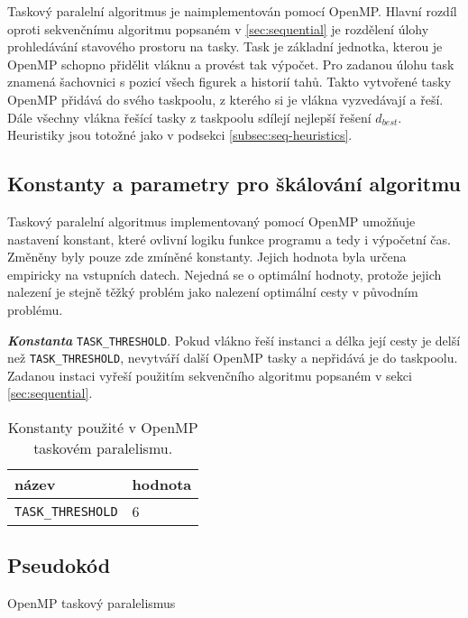 \documentclass{article}
\newcommand{\const}[1]{\texttt{#1}}
\newcommand{\konstanta}[1]{\textbf{\textit{Konstanta}} \const{#1}.}
\begin{document}
    Taskový paralelní algoritmus je naimplementován pomocí OpenMP. Hlavní rozdíl oproti sekvenčnímu algoritmu
    popsaném v \ref{sec:sequential} je rozdělení úlohy prohledávání stavového prostoru na tasky. Task je
    základní jednotka, kterou je OpenMP schopno přidělit vláknu a provést tak výpočet. Pro zadanou úlohu
    task znamená šachovnici s pozicí všech figurek a historií tahů. Takto vytvořené tasky OpenMP přidává
    do svého taskpoolu, z kterého si je vlákna vyzvedávají a řeší. Dále všechny vlákna řešící tasky z
    taskpoolu sdílejí nejlepší řešení $d_{best}$. Heuristiky jsou totožné jako v podsekci \ref{subsec:seq-heuristics}.

    \subsection{Konstanty a parametry pro škálování algoritmu}
    Taskový paralelní algoritmus implementovaný pomocí OpenMP umožňuje nastavení konstant, které ovlivní
    logiku funkce programu a tedy i výpočetní čas. Změněny byly pouze zde zmíněné konstanty. Jejich hodnota
    byla určena empiricky na vstupních datech. Nejedná se o optimální hodnoty, protože jejich nalezení je
    stejně těžký problém jako nalezení optimální cesty v původním problému.

    \konstanta{TASK_THRESHOLD}  Pokud vlákno řeší instanci a délka její cesty je delší než \const{TASK_THRESHOLD}, nevytváří další
    OpenMP tasky a nepřidává je do taskpoolu. Zadanou instaci vyřeší použitím sekvenčního algoritmu popsaném v sekci \ref{sec:sequential}.

    \begin{table}[hb]
        \centering
        \begin{tabular}{|l|l|}
            \hline
            název                  & hodnota \\ \hline
            \const{TASK_THRESHOLD} & 6       \\ \hline
        \end{tabular}
        \caption{Konstanty použité v OpenMP taskovém paralelismu.}
        \label{tab:data-par-constants}
    \end{table}

    \subsection{Pseudokód}

    \begin{algorithm}[H]
        \SetAlgoLined

        \BlankLine

        \;
        \caption{OpenMP taskový paralelismus}
        \label{alg:task-par}
    \end{algorithm}
\end{document}
